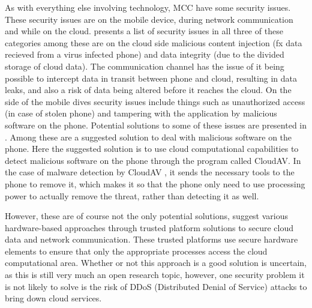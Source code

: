 As with everything else involving technology, MCC have some security issues.
These security issues are on the mobile device, during network communication and while on the cloud.
\citet{6923101} presents a list of security issues in all three of these categories among these are on the cloud side malicious content injection (fx data recieved from a virus infected phone) and data integrity (due to the divided storage of cloud data).
The communication channel has the issue of it being possible to intercept data in transit between phone and cloud, resulting in data leaks, and also a risk of data being altered before it reaches the cloud.
On the side of the mobile dives security issues include things such as unauthorized access (in case of stolen phone) and tampering with the application by malicious software on the phone.
Potential solutions to some of these issues are presented in \citet{6583635}.
Among these are a suggested solution to deal with malicious software on the phone.
Here the suggested solution is to use cloud computational capabilities to detect malicious software on the phone through the program called CloudAV.
In the case of malware detection by CloudAV \citep{Oberheide:2008:CNA:1496711.1496718}, it sends the necessary tools to the phone to remove it, which makes it so that the phone only need to use processing power to actually remove the threat, rather than detecting it as well.

However, these are of course not the only potential solutions, \citet{7056876} suggest various hardware-based approaches through trusted platform solutions to secure cloud data and network communication.
These trusted platforms use secure hardware elements to ensure that only the appropriate processes access the cloud computational area.
Whether or not this approach is a good solution is uncertain, as this is still very much an open research topic, however, one security problem it is not likely to solve is the risk of DDoS (Distributed Denial of Service) attacks to bring down cloud services.